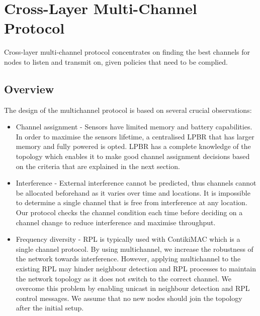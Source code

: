 \section{Cross-Layer Multi-Channel Protocol}
\label{sec:multichannel}
Cross-layer multi-channel protocol concentrates on finding the best channels for nodes to listen and transmit on, given policies that need to be complied. 

\subsection{Overview}


The design of the multichannel protocol is based on several crucial observations:

\begin{itemize}
\item Channel assignment - Sensors have limited memory and battery capabilities. In order to maximise the sensors lifetime, a centralised LPBR that has larger memory and fully powered is opted. LPBR has a complete knowledge of the topology which enables it to make good channel assignment decisions based on the criteria that are explained in the next section. 

\item Interference - External interference cannot be predicted, thus channels cannot be allocated beforehand as it varies over time and locations. It is impossible to determine a single channel that is free from interference at any location. Our protocol checks the channel condition each time before deciding on a channel change to reduce interference and maximise throughput.

\item Frequency diversity - RPL is typically used with ContikiMAC which is a single channel protocol. By using multichannel, we increase the robustness of the network towards interference. However, applying multichannel to the existing RPL may hinder neighbour detection and RPL processes to maintain the network topology as it does not switch to the correct channel. We overcome this problem by enabling unicast in neighbour detection and RPL control messages. We assume that no new nodes should join the topology after the initial setup.
\end{itemize}

